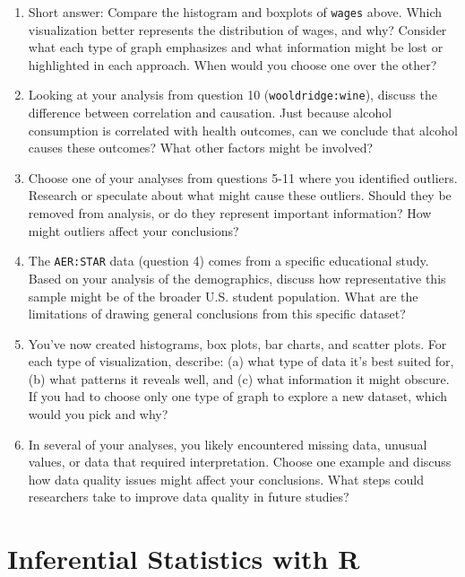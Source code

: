 \documentclass[
  letterpaper,
]{book}
\providecommand{\tightlist}{%
  \setlength{\itemsep}{0pt}\setlength{\parskip}{0pt}}\usepackage{longtable,booktabs,array}
\begin{document}
\begin{enumerate}
\def\labelenumi{\arabic{enumi}.}
\setcounter{enumi}{11}
\tightlist
\item
  Short answer: Compare the histogram and boxplots of \texttt{wages}
  above. Which visualization better represents the distribution of
  wages, and why? Consider what each type of graph emphasizes and what
  information might be lost or highlighted in each approach. When would
  you choose one over the other?
\item
  Looking at your analysis from question 10 (\texttt{wooldridge:wine}),
  discuss the difference between correlation and causation. Just because
  alcohol consumption is correlated with health outcomes, can we
  conclude that alcohol causes these outcomes? What other factors might
  be involved?
\item
  Choose one of your analyses from questions 5-11 where you identified
  outliers. Research or speculate about what might cause these outliers.
  Should they be removed from analysis, or do they represent important
  information? How might outliers affect your conclusions?
\item
  The \texttt{AER:STAR} data (question 4) comes from a specific
  educational study. Based on your analysis of the demographics, discuss
  how representative this sample might be of the broader U.S. student
  population. What are the limitations of drawing general conclusions
  from this specific dataset?
\item
  You've now created histograms, box plots, bar charts, and scatter
  plots. For each type of visualization, describe: (a) what type of data
  it's best suited for, (b) what patterns it reveals well, and (c) what
  information it might obscure. If you had to choose only one type of
  graph to explore a new dataset, which would you pick and why?
\item
  In several of your analyses, you likely encountered missing data,
  unusual values, or data that required interpretation. Choose one
  example and discuss how data quality issues might affect your
  conclusions. What steps could researchers take to improve data quality
  in future studies?
\end{enumerate}


\chapter{Inferential Statistics with R}\label{sec-inferstats}
\end{document}
